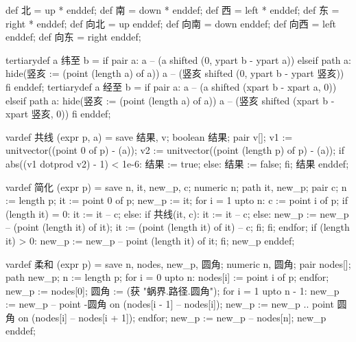 \startMPinclusions[+]
def 北 = up * enddef; 
def 南 = down * enddef;
def 西 = left * enddef; 
def 东 = right * enddef;
def 向北 = up enddef; 
def 向南 = down enddef;
def 向西 = left enddef; 
def 向东 = right enddef;

tertiarydef a 纬至 b = 
  if pair a:
    a -- (a shifted (0, ypart b - ypart a))
  elseif path a:
    hide(竖亥 := (point (length a) of a))
    a -- (竖亥 shifted (0, ypart b - ypart 竖亥))
  fi
enddef;
tertiarydef a 经至 b = 
  if pair a:
    a -- (a shifted (xpart b - xpart a, 0))
  elseif path a:
    hide(竖亥 := (point (length a) of a))
    a -- (竖亥 shifted (xpart b - xpart 竖亥, 0))
  fi
enddef;
\stopMPinclusions

\startMPinclusions[+]
vardef 共线 (expr p, a) =
  save 结果, v; boolean 结果; pair v[];
  v1 := unitvector((point 0 of p) - (a));
  v2 := unitvector((point (length p) of p) - (a));
  if abs((v1 dotprod v2) - 1) < 1e-6:
     结果 := true;
  else:
    结果 := false;
  fi;
  结果
enddef;

vardef 简化 (expr p) =
  save n, it, new_p, c;
  numeric n; path it, new_p; pair c;
  n := length p;
  it := point 0 of p;
  new_p := it;
  for i = 1 upto n:
    c := point i of p;
    if (length it) = 0: 
      it := it -- c;
    else:
      if 共线(it, c):
        it := it -- c;
      else:
        new_p := new_p -- (point (length it) of it);
        it := (point (length it) of it) -- c;
      fi;
    fi;
  endfor;
  if (length it) > 0:
    new_p := new_p -- point (length it) of it;
  fi;
  new_p
enddef;

vardef 柔和 (expr p) =
  save n, nodes, new_p, 圆角; 
  numeric n, 圆角; pair nodes[]; path new_p;
  n := length p;
  for i = 0 upto n:
    nodes[i] := point i of p;
  endfor;
  new_p := nodes[0];
  圆角 := (获 "蜗界.路径.圆角");
  for i = 1 upto n - 1:
    new_p := new_p -- point -圆角 on (nodes[i - 1] -- nodes[i]);
    new_p := new_p .. point 圆角 on (nodes[i] -- nodes[i + 1]);
  endfor;
  new_p := new_p -- nodes[n];
  new_p
enddef;
\stopMPinclusions

